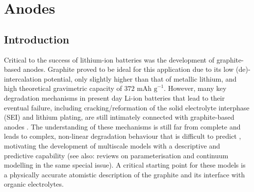 \documentclass[../main.tex]{subfiles}
\begin{document}
\section{Anodes}
\label{sec:anodes}


\subsection{Introduction}
\label{sec:anodes_intro}

Critical to the success of lithium-ion batteries was the development of graphite-based anodes. Graphite proved to be ideal for this application due to its low (de)-intercalation potential, only slightly higher than that of metallic lithium, and high theoretical gravimetric capacity of $\text{372 mAh g}^{-1}$. However, many key degradation mechanisms in present day Li-ion batteries that lead to their eventual failure, including cracking/reformation of the solid electrolyte interphase (SEI) and lithium plating, are still intimately connected with graphite-based anodes \cite{VETTER2005269,ma6041310}. The understanding of these mechanisms is still far from complete and leads to complex, non-linear degradation behaviour that is difficult to predict \cite{YANG201728}, motivating the development of multiscale models with a descriptive and predictive capability (see also: reviews on parameterisation and continuum modelling in the same special issue). A critical starting point for these models is a physically accurate atomistic description of the graphite and its interface with organic electrolytes. 
\end{document}
